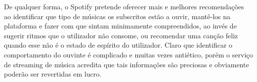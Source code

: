 \par De qualquer forma, o Spotify pretende oferecer mais e melhores recomendações ao identificar que tipo de músicas os subscritos estão a ouvir, mantê-los na plataforma e fazer com que sintam minimamente compreendidos, ao invés de sugerir ritmos que o utilizador não consome,  ou recomendar uma canção feliz quando esse não é o estado de espírito do utilizador. Claro que identificar o comportamento do ouvinte é complicado e muitas vezes antiético, porém o serviço de streaming de música acredita que tais informações são preciosas e obviamente poderão ser revertidas em lucro. 
